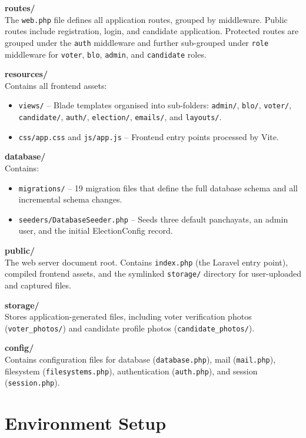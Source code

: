 \textbf{routes/} \\
The \texttt{web.php} file defines all application routes, grouped by middleware. Public routes include registration, login, and candidate application. Protected routes are grouped under the \texttt{auth} middleware and further sub-grouped under \texttt{role} middleware for \texttt{voter}, \texttt{blo}, \texttt{admin}, and \texttt{candidate} roles.

\textbf{resources/} \\
Contains all frontend assets:
\begin{itemize}
    \item \texttt{views/} -- Blade templates organised into sub-folders: \texttt{admin/}, \texttt{blo/}, \texttt{voter/}, \texttt{candidate/}, \texttt{auth/}, \texttt{election/}, \texttt{emails/}, and \texttt{layouts/}.
    \item \texttt{css/app.css} and \texttt{js/app.js} -- Frontend entry points processed by Vite.
\end{itemize}

\textbf{database/} \\
Contains:
\begin{itemize}
    \item \texttt{migrations/} -- 19 migration files that define the full database schema and all incremental schema changes.
    \item \texttt{seeders/DatabaseSeeder.php} -- Seeds three default panchayats, an admin user, and the initial ElectionConfig record.
\end{itemize}

\textbf{public/} \\
The web server document root. Contains \texttt{index.php} (the Laravel entry point), compiled frontend assets, and the symlinked \texttt{storage/} directory for user-uploaded and captured files.

\textbf{storage/} \\
Stores application-generated files, including voter verification photos (\texttt{voter\_photos/}) and candidate profile photos (\texttt{candidate\_photos/}).

\textbf{config/} \\
Contains configuration files for database (\texttt{database.php}), mail (\texttt{mail.php}), filesystem (\texttt{filesystems.php}), authentication (\texttt{auth.php}), and session (\texttt{session.php}).

\section{Environment Setup}

